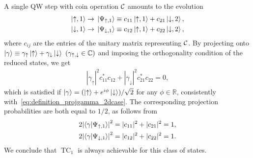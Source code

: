 \documentclass[
	aps, pra,
	superscriptaddress, twocolumn,
	floatfix,
	10pt
]{revtex4-1}
\newcommand{\on}[1]{\operatorname{#1}}
\newcommand{\parTitle}[1]{\noindent{\color{Mahogany}(\emph{#1})}}
\newcommand{\RR}{\mathbb{R}}
\newcommand{\calW}{{\mathcal{W}}}
\renewcommand{\parTitle}[1]{}
\begin{document}
\parTitle{Single step}
A single QW step with coin operation  ${\cal C}$ %
amounts to the evolution
\begin{equation}
\begin{aligned}
	\ket{\uparrow,1} &\rightarrow \ket*{\Psi_{\uparrow,1}} \equiv c_{11}\ket{\uparrow,1} + c_{21}\ket{\downarrow,2}, \\
	\ket{\downarrow,1} &\rightarrow \ket*{\Psi_{\downarrow,1}} \equiv c_{12}\ket{\uparrow,1} + c_{22}\ket{\downarrow,2},
\end{aligned}
\end{equation}
where $c_{ij}$ are the entries of the unitary matrix representing ${\cal C}$. By projecting onto $\ket\gamma\equiv \gamma_\uparrow\ket\uparrow+\gamma_\downarrow\ket\downarrow~(\gamma_{\uparrow,\downarrow}\in\mathbb{C})$ and imposing %
the orthogonality condition of the reduced states, we get%
\begin{equation}
\begin{gathered}
	 |\gamma_\uparrow|^2 c_{11}^* c_{12} + |\gamma_\downarrow|^2 c_{21}^* c_{22} = 0,
\end{gathered}
\end{equation}
which is satisfied if $\ket\gamma = (\ket\uparrow + e^{i\phi}\ket\downarrow)/\sqrt2$ for any $\phi\in\RR$, consistently with~\cref{eq:definition_projgamma_2dcase}.
The corresponding projection probabilities are both equal to $1/2$, as follows from
\begin{equation}
\begin{aligned}
	2\abs{\braket{\gamma}{\Psi_{\uparrow,1}}}^2 &= |c_{11}|^2 + |c_{21}|^2 = 1, \\
	2\abs{\braket{\gamma}{\Psi_{\downarrow,1}}}^2 &= |c_{12}|^2 + |c_{22}|^2 = 1.
\end{aligned}
\end{equation}
We conclude that $\on{TC}_1$ is always achievable for this class of states.
\end{document}

